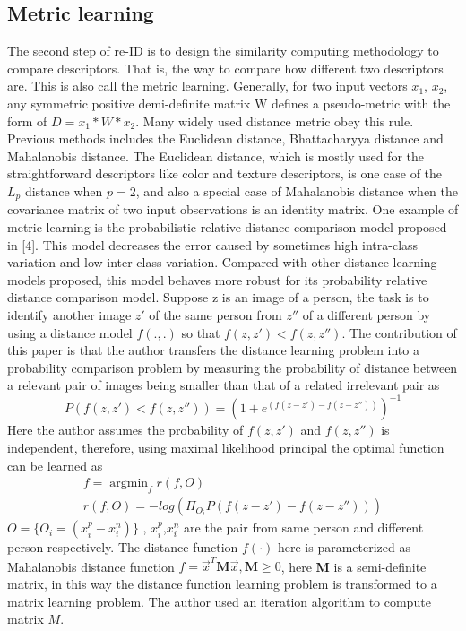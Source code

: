 \documentclass[conference,compsoc]{IEEEtran}
\begin{document}
\subsection{Metric learning}
The second step of re-ID is to design the similarity computing methodology to compare descriptors. That is, the way to compare how different two descriptors are. This is also call the metric learning. Generally, for two input vectors $x_1$, $x_2$, any symmetric positive demi-definite matrix W defines a pseudo-metric with the form of $D = x_1*W*x_2$. Many widely used distance metric obey this rule. Previous methods includes the Euclidean distance, Bhattacharyya distance and Mahalanobis distance. The Euclidean distance, which is mostly used for the straightforward descriptors like color and texture descriptors,  is one case of the $L_p$ distance when $p=2$, and also a special case of Mahalanobis distance when the covariance matrix of two input observations is an identity matrix. One example of metric learning is the probabilistic relative distance comparison model proposed in [4]. This model decreases the error caused by sometimes high intra-class variation and low inter-class variation. Compared with other distance learning models proposed, this model behaves more robust for its probability relative distance comparison model. Suppose z is an image of a person, the task is to identify another image $z'$ of the same person from $z''$ of a different person by using a distance model $f(.,.)$ so that $f(z, z')< f(z, z'')$. The contribution of this paper is that the author transfers the distance learning problem into a probability comparison problem by measuring the probability of distance between a relevant pair of images being smaller than that of a related irrelevant pair as
\begin{equation}P(f(z,z')<f(z,z'')) = (1+e^{(f(z-z')-f(z-z''))})^{-1}\end{equation}
Here the author assumes the probability of $f(z,z')$ and $f(z,z'')$ is independent, therefore, using maximal likelihood principal the optimal function can be learned as
\begin{equation}
\begin{aligned}
f = \mathop{\arg\min}_f r(f,O) \\
r(f,O) = -log(\Pi_{O_i}P(f(z-z')-f(z-z'')))
\end{aligned}
\end{equation}
$O=\{O_i=(x_i^p-x_i^n)\}$ , $x_i^p$,$x_i^n$ are the pair from same person and different person respectively.
The distance function $f(\cdot)$ here is parameterized as Mahalanobis distance function
$f=\overrightarrow{x}^T\textbf{M}\overrightarrow{x},\textbf{M}\ge0$,
here \textbf{M} is a semi-definite matrix, in this way the distance function learning problem is transformed to a matrix learning problem. The author used an iteration algorithm to compute matrix $M$.
\end{document}
